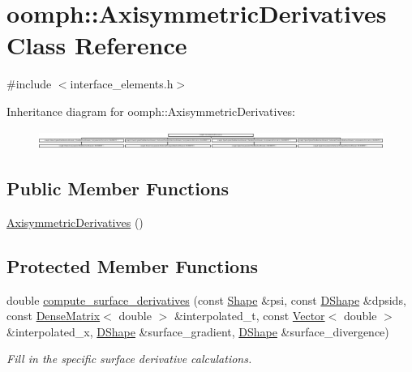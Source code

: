 \hypertarget{classoomph_1_1AxisymmetricDerivatives}{}\section{oomph\+:\+:Axisymmetric\+Derivatives Class Reference}
\label{classoomph_1_1AxisymmetricDerivatives}


{\ttfamily \#include $<$interface\+\_\+elements.\+h$>$}

Inheritance diagram for oomph\+:\+:Axisymmetric\+Derivatives\+:\begin{figure}[H]
\begin{center}
\leavevmode
\includegraphics[height=0.595745cm]{classoomph_1_1AxisymmetricDerivatives}
\end{center}
\end{figure}
\subsection*{Public Member Functions}
\begin{DoxyCompactItemize}
\item 
\hyperlink{classoomph_1_1AxisymmetricDerivatives_a91b259ef45c7563b05bf79de4b0fe4bf}{Axisymmetric\+Derivatives} ()
\end{DoxyCompactItemize}
\subsection*{Protected Member Functions}
\begin{DoxyCompactItemize}
\item 
double \hyperlink{classoomph_1_1AxisymmetricDerivatives_a306ea6b57d09d57e87e8d74a13c2f828}{compute\+\_\+surface\+\_\+derivatives} (const \hyperlink{classoomph_1_1Shape}{Shape} \&psi, const \hyperlink{classoomph_1_1DShape}{D\+Shape} \&dpsids, const \hyperlink{classoomph_1_1DenseMatrix}{Dense\+Matrix}$<$ double $>$ \&interpolated\+\_\+t, const \hyperlink{classoomph_1_1Vector}{Vector}$<$ double $>$ \&interpolated\+\_\+x, \hyperlink{classoomph_1_1DShape}{D\+Shape} \&surface\+\_\+gradient, \hyperlink{classoomph_1_1DShape}{D\+Shape} \&surface\+\_\+divergence)
\begin{DoxyCompactList}\small\item\em Fill in the specific surface derivative calculations. \end{DoxyCompactList}\end{DoxyCompactItemize}


